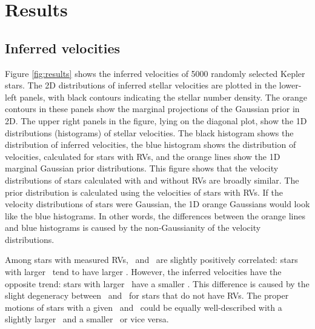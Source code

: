 \section{Results}
\label{sec:results}

\subsection{Inferred velocities}

Figure \ref{fig:results} shows the inferred velocities of 5000 randomly
selected Kepler stars.
The 2D distributions of inferred stellar velocities are plotted in the
lower-left panels, with black contours indicating the stellar number density.
The orange contours in these panels show the marginal projections of the
Gaussian prior in 2D.
The upper right panels in the figure, lying on the diagonal plot, show the 1D
distributions (histograms) of stellar velocities.
The black histogram shows the distribution of inferred velocities, the blue
histogram shows the distribution of velocities, calculated for stars with RVs,
and the orange lines show the 1D marginal Gaussian prior distributions.
This figure shows that the velocity distributions of stars calculated with and
without RVs are broadly similar.
The prior distribution is calculated using the velocities of stars with RVs.
If the velocity distributions of stars were Gaussian, the 1D orange Gaussians
would look like the blue histograms.
In other words, the differences between the orange lines and blue histograms
is caused by the non-Gaussianity of the velocity distributions.

Among stars with measured RVs, \vy\ and \vz\ are slightly positively
correlated: stars with larger \vy\ tend to have larger \vz.
However, the inferred velocities have the opposite trend: stars with larger
\vy\ have a smaller \vz.
This difference is caused by the slight degeneracy between \vy\ and \vz\ for
stars that do not have RVs.
The proper motions of stars with a given \vy\ and \vz\ could be equally
well-described with a slightly larger \vy\ and a smaller \vz\ or vice versa.

